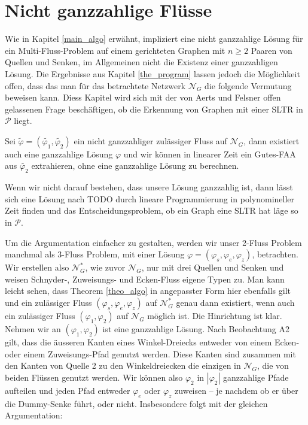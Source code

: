 \chapter{Nicht ganzzahlige Flüsse}

Wie in Kapitel \ref{main_algo} erwähnt, impliziert eine nicht ganzzahlige Lösung für ein Multi-Fluss-Problem auf einem gerichteten Graphen mit $n\geq 2$ Paaren von Quellen und Senken, im Allgemeinen nicht die Existenz einer ganzzahligen Lösung. Die Ergebnisse aus Kapitel \ref{the_program} lassen jedoch die Möglichkeit offen, dass das man für das betrachtete Netzwerk $\mathcal{N}_G$ die folgende Vermutung beweisen kann. Diess Kapitel wird sich mit der von Aerts und Felsner offen gelassenen Frage beschäftigen, ob die Erkennung von Graphen mit einer SLTR in $\mathcal{P}$ liegt.

\begin{conjecture}\label{int_conj}
Sei $\tilde{\varphi}=(\tilde{\varphi_1},\tilde{\varphi_2})$ ein nicht ganzzahliger zulässiger Fluss auf $\mathcal{N}_G$, dann existiert auch eine ganzzahlige Lösung $\varphi$ und wir können in linearer Zeit ein Gutes-FAA aus $\tilde{\varphi_2}$ extrahieren, ohne eine ganzzahlige Lösung zu berechnen.
\end{conjecture}

\begin{remark}
Wenn wir nicht darauf bestehen, dass unsere Lösung ganzzahlig ist, dann lässt sich eine Lösung nach TODO durch lineare Programmierung in polynomineller Zeit finden und das Entscheidungsproblem, ob ein Graph eine SLTR hat läge so in $\mathcal{P}$.
\end{remark}

Um die Argumentation einfacher zu gestalten, werden wir unser 2-Fluss Problem manchmal als 3-Fluss Problem, mit einer Lösung $\varphi=(\varphi_s,\varphi_e,\varphi_z)$, betrachten. Wir erstellen also $\mathcal{N}_G^*$, wie zuvor $\mathcal{N}_G$, nur mit drei Quellen und Senken und weisen Schnyder-, Zuweisungs- und Ecken-Fluss eigene Typen zu. Man kann leicht sehen, dass Theorem \ref{theo_algo} in angepasster Form hier ebenfalls gilt und ein zulässiger  Fluss $(\varphi_s,\varphi_e,\varphi_z)$ auf $\mathcal{N}_G^*$ genau dann existiert, wenn auch ein zulässiger Fluss $(\varphi_1,\varphi_2)$ auf $\mathcal{N}_G$ möglich ist. Die Hinrichtung ist klar. Nehmen wir an $(\varphi_1,\varphi_2)$ ist eine ganzzahlige Lösung. Nach Beobachtung A2 gilt, dass die äusseren Kanten eines Winkel-Dreiecks entweder von einem Ecken- oder einem Zuweisungs-Pfad genutzt werden. Diese Kanten sind zusammen mit den Kanten von Quelle 2 zu den Winkeldreiecken die einzigen in $\mathcal{N}_G$, die von beiden Flüssen genutzt werden. Wir können also $\varphi_2$ in $|\varphi_2|$ ganzzahlige Pfade aufteilen und jeden Pfad entweder $\varphi_e$ oder $\varphi_z$ zuweisen -- je nachdem ob er über die Dummy-Senke führt, oder nicht. Insbesondere folgt mit der gleichen Argumentation:

